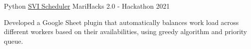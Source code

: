 \begin{cventries}
  \cventry
    {Python} %
    {\href{https://devpost.com/software/svi-scheduler}{SVI Scheduler}} %
    {MariHacks 2.0 - Hackathon} %
    {2021} %
    {
      \begin{cvitems} %
        \item {Developed a Google Sheet plugin that automatically balances work load across different workers based on their availabilities, using greedy algorithm and priority queue.}
      \end{cvitems}
    }

\end{cventries}

